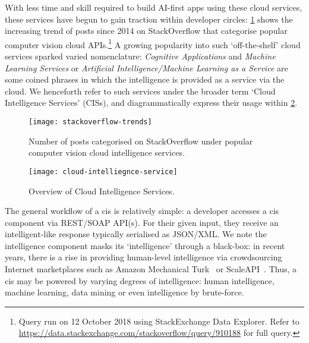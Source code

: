 With less time and skill required to build \gls{AI}-first apps using these cloud services,  these services have begun to gain traction within developer circles: \cref{fig:introduction:stackoverflow-trends} shows the increasing trend of posts since 2014 on StackOverflow that categorise popular computer vision cloud APIs.\footnote{Query run on 12 October 2018 using StackExchange Data Explorer. Refer to \url{https://data.stackexchange.com/stackoverflow/query/910188} for full query.} A growing popularity into such `off-the-shelf' cloud services sparked varied nomenclature: \textit{Cognitive Applications} and \textit{Machine Learning Services} \citep{Hwang:2017tr} or \textit{Artificial Intelligence/Machine Learning as a Service} \citep{Ribeiro:2015dz} are some coined phrases in which the intelligence is provided as a service via the cloud. We henceforth refer to such services under the broader term `Cloud Intelligence Services' (\glspl{CIS}), and diagrammatically express their usage within \cref{fig:introduction:cloud-intelliegnce-service}.

\begin{figure}[t]
\centering
\caption[Increasing interest in the developer community of computer vision APIs]{Number of posts categorised on StackOverflow under popular computer vision cloud intelligence services.}
\label{fig:introduction:stackoverflow-trends}
\texttt{[image: stackoverflow-trends]}
\end{figure}

\begin{figure}[th]
\centering
\caption[Overview of cloud intelligence services]{Overview of Cloud Intelligence Services.}
\label{fig:introduction:cloud-intelliegnce-service}
\texttt{[image: cloud-intelliegnce-service]}
\end{figure}

 
The general workflow of a \gls{cis} is relatively simple: a developer accesses a \gls{cis} component via REST/SOAP API(s). For their given input, they receive an intelligent-like response typically serialised as JSON/XML. We note the intelligence component masks its `intelligence' through a black-box: in recent years, there is a rise in providing human-level intelligence via crowdsourcing Internet marketplaces such as Amazon Mechanical Turk~\citep{MTurk:Home} or ScaleAPI~\citep{ScaleAPI:Home}. Thus, a \gls{cis} may be powered by varying degrees of intelligence: human intelligence, machine learning, data mining or even intelligence by brute-force.

